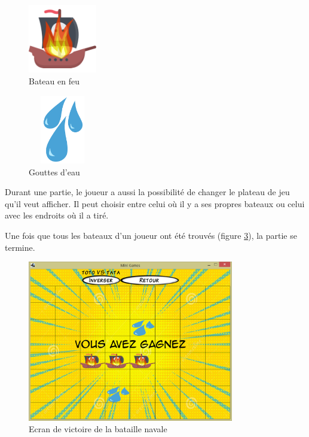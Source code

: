 \documentclass{report}
\begin{document}
\begin{figure}[H]
	\centering\includegraphics[width=3cm]{pirate-ship-dead}
	\caption{Bateau en feu}
	\label{shipInFire}
\end{figure}

\begin{figure}[H]
	\centering\includegraphics[width=3cm, height=3cm]{plouf}
	\caption{Gouttes d'eau}
	\label{tears}
\end{figure}

Durant une partie, le joueur a aussi la possibilité de changer le plateau de jeu qu'il veut afficher. Il peut choisir entre celui où il y a ses propres bateaux ou
celui avec les endroits où il a tiré.\par{}
Une fois que tous les bateaux d'un joueur ont été trouvés (figure \ref{batailleWin}), la partie se termine.

\begin{figure}[H]
	\centering\includegraphics[width=9cm]{batailleWin}
	\caption{Ecran de victoire de la bataille navale}
	\label{batailleWin}
\end{figure}
\end{document}
